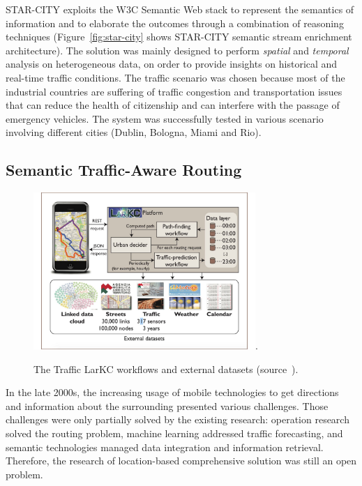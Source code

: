 STAR-CITY exploits the W3C Semantic Web stack to represent the semantics of information and to elaborate the outcomes through a combination of reasoning techniques (Figure~\ref{fig:star-city} shows STAR-CITY semantic stream enrichment architecture). The solution was mainly designed to perform \textit{spatial} and \textit{temporal} analysis on heterogeneous data, on order to provide insights on historical and real-time traffic conditions.
The traffic scenario was chosen because most of the industrial countries are suffering of traffic congestion and transportation issues that can reduce the health of citizenship and can interfere with the passage of emergency vehicles.
The system was successfully tested in various scenario involving different cities (Dublin, Bologna, Miami and Rio).

\subsection{Semantic Traffic-Aware Routing} \label{sec:uda-trafficlark}

\begin{figure}[t]
	\centering
	\includegraphics[width=0.75\textwidth]{img/traffic-lark.pdf}.
    \caption{The Traffic LarKC workflows and external datasets (source~\cite{DBLP:journals/internet/ValleCDGST11}).}
    \label{fig:traffic-lark}
\end{figure}

In the late 2000s, the increasing usage of mobile technologies to get directions and information about the surrounding presented various challenges. Those challenges were only partially solved by the existing research: operation research solved the routing problem, machine learning addressed traffic forecasting, and semantic technologies managed data integration and information retrieval. Therefore, the research of location-based comprehensive solution was still an open problem.

